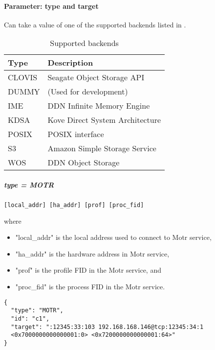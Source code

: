 \paragraph{Parameter: type and target}
Can take a value of one of the supported backends listed in .

\begin{preserve}
\begin{table}[!h]
  \begin{center}
    \begin{tabular}{ll}
      Type   & Description                     \\ 
      \hline
      CLOVIS & Seagate Object Storage API      \\ 
      DUMMY  & (Used for development)          \\ 
      IME    & DDN Infinite Memory Engine      \\ 
      KDSA   & Kove Direct System Architecture \\ 
      POSIX  & POSIX interface                 \\ 
      S3     & Amazon Simple Storage Service   \\ 
      WOS    & DDN Object Storage              \\ 
    \end{tabular}
  \end{center}
  \caption{Supported backends}%
  \label{tab:supported_backends}
\end{table}
\end{preserve}

\subparagraph{type = MOTR}

\begin{lstlisting} 
[local_addr] [ha_addr] [prof] [proc_fid]
\end{lstlisting}

where
\begin{itemize}
  \item "local\_addr" is the local address used to connect to Motr service, 
  \item "ha\_addr" is the hardware address in Motr service, 
  \item "prof" is the profile FID in the Motr service, and
  \item "proc\_fid" is the process FID in the Motr service.
\end{itemize}

\begin{lstlisting} 
{
  "type": "MOTR",
  "id": "c1",
  "target": ":12345:33:103 192.168.168.146@tcp:12345:34:1 
  <0x7000000000000001:0> <0x7200000000000001:64>"
}
\end{lstlisting}

